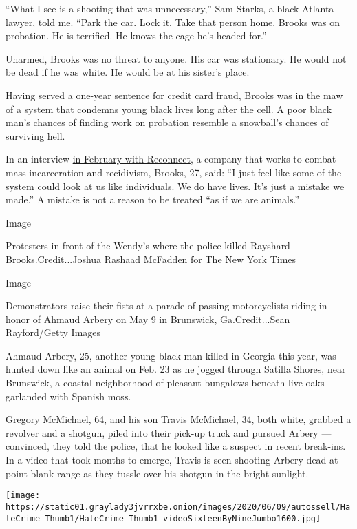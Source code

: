 ``What I see is a shooting that was unnecessary,'' Sam Starks, a black
Atlanta lawyer, told me. ``Park the car. Lock it. Take that person home.
Brooks was on probation. He is terrified. He knows the cage he's headed
for.''

Unarmed, Brooks was no threat to anyone. His car was stationary. He
would not be dead if he was white. He would be at his sister's place.

Having served a one-year sentence for credit card fraud, Brooks was in
the maw of a system that condemns young black lives long after the cell.
A poor black man's chances of finding work on probation resemble a
snowball's chances of surviving hell.

In an interview
\href{https://www.cnn.com/2020/06/17/us/rayshard-brooks-interview-reconnect-life-after-incarceration/index.html}{in
February with Reconnect}, a company that works to combat mass
incarceration and recidivism, Brooks, 27, said: ``I just feel like some
of the system could look at us like individuals. We do have lives. It's
just a mistake we made.'' A mistake is not a reason to be treated ``as
if we are animals.''

Image

Protesters in front of the Wendy's where the police killed Rayshard
Brooks.Credit...Joshua Rashaad McFadden for The New York Times

Image

Demonstrators raise their fists at a parade of passing motorcyclists
riding in honor of Ahmaud Arbery on May 9 in Brunswick, Ga.Credit...Sean
Rayford/Getty Images

Ahmaud Arbery, 25, another young black man killed in Georgia this year,
was hunted down like an animal on Feb. 23 as he jogged through Satilla
Shores, near Brunswick, a coastal neighborhood of pleasant bungalows
beneath live oaks garlanded with Spanish moss.

Gregory McMichael, 64, and his son Travis McMichael, 34, both white,
grabbed a revolver and a shotgun, piled into their pick-up truck and
pursued Arbery --- convinced, they told the police, that he looked like
a suspect in recent break-ins. In a video that took months to emerge,
Travis is seen shooting Arbery dead at point-blank range as they tussle
over his shotgun in the bright sunlight.

\texttt{[image: https://static01.graylady3jvrrxbe.onion/images/2020/06/09/autossell/HateCrime\_Thumb1/HateCrime\_Thumb1-videoSixteenByNineJumbo1600.jpg]}

